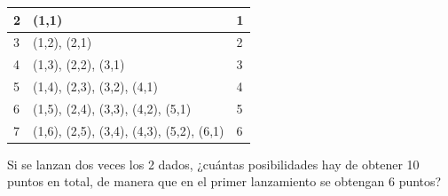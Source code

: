 \documentclass[10pt,letterpaper,addpoints]{exam}
\begin{document}
\begin{multicols}{2}
\begin{questions}
\begin{center}
\begin{tabular}{|p{.4cm}|p{3.9cm}|p{2cm}|}
\hline 
2 & (1,1) & \hspace*{1cm}1 \\ 
\hline 
3 & (1,2), (2,1) & \hspace*{1cm}2 \\ 
\hline 
4 & (1,3), (2,2), (3,1) & \hspace*{1cm}3 \\ 
\hline 
5 & (1,4), (2,3), (3,2), (4,1) & \hspace*{1cm}4 \\ 
\hline 
6 & (1,5), (2,4), (3,3), (4,2), (5,1) & \hspace*{1cm}5 \\ 
\hline 
7 & (1,6), (2,5), (3,4), (4,3), (5,2), (6,1) & \hspace*{1cm}6 \\ 
\hline 
\end{tabular} 
\end{center}
Si se lanzan dos veces los 2 dados, ¿cuántas posibilidades hay de obtener 10 puntos en total, de manera que en el primer lanzamiento se obtengan 6 puntos?


\end{questions}
\end{multicols}
\end{document}
